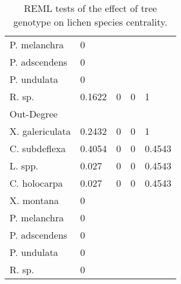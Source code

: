 \begin{table}[ht]
\begin{tabular}{lllll}
  P. melanchra & 0 &  &  &  \\ 
  P. adscendens & 0 &  &  &  \\ 
  P. undulata & 0 &  &  &  \\ 
  R. sp. & 0.1622 & 0 & 0 & 1 \\ 
  Out-Degree &  &  &  &  \\ 
  X. galericulata & 0.2432 & 0 & 0 & 1 \\ 
  C. subdeflexa & 0.4054 & 0 & 0 & 0.4543 \\ 
  L. spp. & 0.027 & 0 & 0 & 0.4543 \\ 
  C. holocarpa & 0.027 & 0 & 0 & 0.4543 \\ 
  X. montana & 0 &  &  &  \\ 
  P. melanchra & 0 &  &  &  \\ 
  P. adscendens & 0 &  &  &  \\ 
  P. undulata & 0 &  &  &  \\ 
  R. sp. & 0 &  &  &  \\ 
   \hline
\end{tabular}
\caption{REML tests of the effect of tree genotype on lichen species centrality.} 
\label{tab:sppcen}
\end{table}
